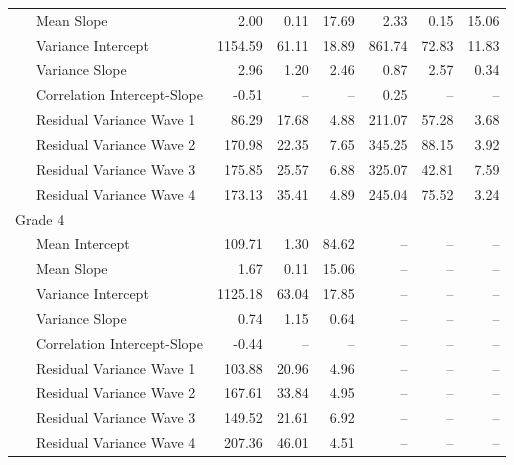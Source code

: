 \documentclass[
  english,
  man, fleqn, noextraspace]{apa6}
\begin{document}
\begin{center}
\begin{ThreePartTable}
\begin{longtable}{lrrrrrr}
\ \ \ Mean Slope & 2.00 & 0.11 & 17.69 & 2.33 & 0.15 & 15.06\\
\ \ \ Variance Intercept & 1154.59 & 61.11 & 18.89 & 861.74 & 72.83 & 11.83\\
\ \ \ Variance Slope & 2.96 & 1.20 & 2.46 & 0.87 & 2.57 & 0.34\\
\ \ \ Correlation Intercept-Slope & -0.51 & -- & -- & 0.25 & -- & --\\
\ \ \ Residual Variance Wave 1 & 86.29 & 17.68 & 4.88 & 211.07 & 57.28 & 3.68\\
\ \ \ Residual Variance Wave 2 & 170.98 & 22.35 & 7.65 & 345.25 & 88.15 & 3.92\\
\ \ \ Residual Variance Wave 3 & 175.85 & 25.57 & 6.88 & 325.07 & 42.81 & 7.59\\
\ \ \ Residual Variance Wave 4 & 173.13 & 35.41 & 4.89 & 245.04 & 75.52 & 3.24\\
Grade 4 &  &  &  &  &  & \\
\ \ \ Mean Intercept & 109.71 & 1.30 & 84.62 & -- & -- & --\\
\ \ \ Mean Slope & 1.67 & 0.11 & 15.06 & -- & -- & --\\
\ \ \ Variance Intercept & 1125.18 & 63.04 & 17.85 & -- & -- & --\\
\ \ \ Variance Slope & 0.74 & 1.15 & 0.64 & -- & -- & --\\
\ \ \ Correlation Intercept-Slope & -0.44 & -- & -- & -- & -- & --\\
\ \ \ Residual Variance Wave 1 & 103.88 & 20.96 & 4.96 & -- & -- & --\\
\ \ \ Residual Variance Wave 2 & 167.61 & 33.84 & 4.95 & -- & -- & --\\
\ \ \ Residual Variance Wave 3 & 149.52 & 21.61 & 6.92 & -- & -- & --\\
\ \ \ Residual Variance Wave 4 & 207.36 & 46.01 & 4.51 & -- & -- & --\\
\bottomrule
\end{longtable}

\end{ThreePartTable}
\end{center}
\end{document}
